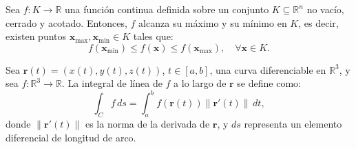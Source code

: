 \begin{teorema}
\label{Weierstrass}
Sea $f: K \to \mathbb{R}$ una función continua definida sobre un conjunto $K \subseteq \mathbb{R}^n$ no vacío, cerrado y acotado. Entonces, $f$ alcanza su máximo y su mínimo en $K$, es decir, existen puntos $\mathbf{x}_\text{max}, \mathbf{x}_\text{min} \in K$ tales que:
\[
f(\mathbf{x}_\text{min}) \leq f(\mathbf{x}) \leq f(\mathbf{x}_\text{max}), \quad \forall \mathbf{x} \in K.
\]
\end{teorema}

\begin{definicion}
\label{def:integral_linea}
Sea $\mathbf{r}(t) = (x(t), y(t), z(t))$, $t \in [a, b]$, una curva diferenciable en $\mathbb{R}^3$, y sea $f: \mathbb{R}^3 \to \mathbb{R}$. La integral de línea de $f$ a lo largo de $\mathbf{r}$ se define como:
\[
\int_C f \, ds = \int_a^b f(\mathbf{r}(t)) \|\mathbf{r}'(t)\| \, dt,
\]
donde $\|\mathbf{r}'(t)\|$ es la norma de la derivada de $\mathbf{r}$, y $ds$ representa un elemento diferencial de longitud de arco.
\end{definicion}